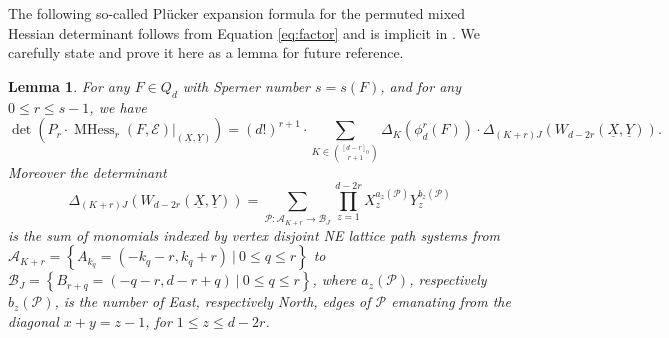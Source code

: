 \documentclass[unnumsec,webpdf,modern,medium]{oup-authoring-template}
\theoremstyle{theorem}
\newtheorem{lemma}[theorem]{Lemma}
\theoremstyle{definition}
\begin{document}
The following so-called Pl\"ucker expansion formula for the permuted mixed Hessian determinant follows from Equation \eqref{eq:factor} and is implicit in \cite[Theorem 4.21]{MMS}.  We carefully state and prove it here as a lemma for future reference.
\begin{lemma}
	\label{lem:Plucker}
	For any $F\in Q_d$ with Sperner number $s=s(F)$, and for any $0\leq r\leq s-1$, we have 
\begin{equation}
	\label{eq:detMixed}
	\det\left(P_r\cdot \operatorname{MHess}_r(F,\mathcal{E})|_{(\underline{X},\underline{Y})}\right)=(d!)^{r+1}\cdot \sum_{K\in\binom{[d-r]_0}{r+1}}\Delta_K\left(\phi^r_d(F)\right)\cdot \Delta_{(K+r)J}\left(W_{d-2r}\left(\underline{X},\underline{Y}\right)\right).
\end{equation}
Moreover the determinant 
\begin{equation}
\label{eq:Pathsystem}	\Delta_{(K+r)J}\left(W_{d-2r}(\underline{X},\underline{Y})\right)=\sum_{\mathcal{P}\colon \mathcal{A}_{K+r}\rightarrow \mathcal{B}_J}\prod_{z=1}^{d-2r}X_z^{a_z(\mathcal{P})}Y_z^{b_z(\mathcal{P})}
\end{equation} 
is the sum of monomials indexed by vertex disjoint NE lattice path systems from $\mathcal{A}_{K+r}=\left\{A_{k_q}=(-k_q-r,k_q+r) \ | \ 0\leq q\leq r\right\}$ to $\mathcal{B}_J=\left\{B_{r+q}=(-q-r, d-r+q) \ | \ 0\leq q\leq r\right\}$, where $a_z(\mathcal{P})$, respectively $b_z(\mathcal{P})$, is the number of East, respectively North, edges of $\mathcal{P}$ emanating from the diagonal $x+y=z-1$, for $1\leq z\leq d-2r$.
\end{lemma}
\end{document}
